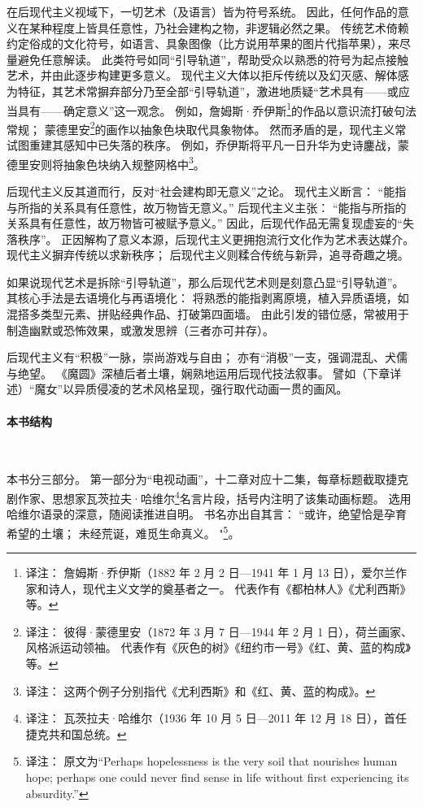 在后现代主义视域下，一切艺术（及语言）皆为符号系统。
因此，任何作品的意义在某种程度上皆具任意性，乃社会建构之物，非逻辑必然之果。
传统艺术倚赖约定俗成的文化符号，如语言、具象图像（比方说用苹果的图片代指苹果），来尽量避免任意解读。
此类符号如同“引导轨道”，帮助受众以熟悉的符号为起点接触艺术，并由此逐步构建更多意义。
现代主义大体以拒斥传统以及幻灭感、解体感为特征，其艺术常摒弃部分乃至全部“引导轨道”，激进地质疑“艺术具有——或应当具有——确定意义”这一观念。
例如，詹姆斯·乔伊斯\footnote{%
    译注：
    詹姆斯·乔伊斯（1882 年 2 月 2 日—1941 年 1 月 13 日），爱尔兰作家和诗人，现代主义文学的奠基者之一。
    代表作有《都柏林人》《尤利西斯》等。
}的作品以意识流打破句法常规；
蒙德里安\footnote{%
    译注：
    彼得·蒙德里安（1872 年 3 月 7 日—1944 年 2 月 1 日），荷兰画家、风格派运动领袖。
    代表作有《灰色的树》《纽约市一号》《红、黄、蓝的构成》等。
}的画作以抽象色块取代具象物体。
然而矛盾的是，现代主义常试图重建其感知中已失落的秩序\cite{ref3}。
例如，乔伊斯将平凡一日升华为史诗鏖战，蒙德里安则将抽象色块纳入规整网格中\footnote{%
    译注：
    这两个例子分别指代《尤利西斯》和《红、黄、蓝的构成》。
}。

后现代主义反其道而行，反对“社会建构即无意义”之论。
现代主义断言：
“能指与所指的关系具有任意性，故万物皆无意义。”
后现代主义主张：
“能指与所指的关系具有任意性，故万物皆可被赋予意义。”
因此，后现代作品无需复现虚妄的“失落秩序”。
正因解构了意义本源，后现代主义更拥抱流行文化作为艺术表达媒介\cite{ref4}。
现代主义摒弃传统以求新秩序；
后现代主义则糅合传统与新异，追寻奇趣之境\cite{ref5}。

如果说现代艺术是拆除“引导轨道”，那么后现代艺术则是刻意凸显“引导轨道”。
其核心手法是去语境化与再语境化：
将熟悉的能指剥离原境，植入异质语境，如混搭多类型元素、拼贴经典作品、打破第四面墙\cite{ref5}。
由此引发的错位感，常被用于制造幽默或恐怖效果，或激发思辨（三者亦可并存）。

后现代主义有“积极”一脉，崇尚游戏与自由；
亦有“消极”一支，强调混乱、犬儒与绝望\cite{ref6}。
《魔圆》深植后者土壤，娴熟地运用后现代技法叙事。
譬如（下章详述）“魔女”以异质侵凌的艺术风格呈现，强行取代动画一贯的画风。
\paragraph{本书结构}~{}

本书分三部分。
第一部分为“电视动画”，十二章对应十二集，每章标题截取捷克剧作家、思想家瓦茨拉夫·哈维尔\footnote{%
    译注：
    瓦茨拉夫·哈维尔（1936 年 10 月 5 日—2011 年 12 月 18 日），首任捷克共和国总统。
}名言片段，括号内注明了该集动画标题。
选用哈维尔语录的深意，随阅读推进自明。
书名亦出自其言：
``或许，绝望恰是孕育希望的土壤；
未经荒诞，难觅生命真义。 %
"\footnote{%
    译注：
    原文为``Perhaps hopelessness is the very soil that nourishes human hope;
    perhaps one could never find sense in life without first experiencing its absurdity.''
}\cite{ref7}。

